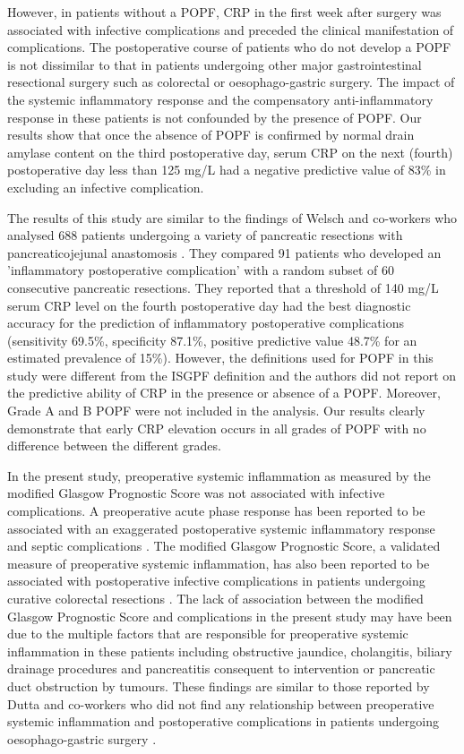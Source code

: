 However, in patients without a POPF, CRP in the first week after surgery was associated with infective complications and preceded the clinical manifestation of complications. 
The postoperative course of patients who do not develop a POPF is not dissimilar to that in patients undergoing other major gastrointestinal resectional surgery such as colorectal or oesophago-gastric surgery. 
The impact of the systemic inflammatory response and the compensatory anti-inflammatory response in these patients is not confounded by the presence of POPF. 
Our results show that once the absence of POPF is confirmed by normal drain amylase content on the third postoperative day, serum CRP on the next (fourth) postoperative day less than 125 mg/L had a negative predictive value of 83\% in excluding an infective complication. 

The results of this study are similar to the findings of Welsch and co-workers who analysed 688 patients undergoing a variety of pancreatic resections with pancreaticojejunal anastomosis \parencite{welsch_persisting_2008}. 
They compared 91 patients who developed an 'inflammatory postoperative complication' with a random subset of 60 consecutive pancreatic resections. 
They reported that a threshold of 140 mg/L serum CRP level on the fourth postoperative day had the best diagnostic accuracy for the prediction of inflammatory postoperative complications (sensitivity 69.5\%, specificity 87.1\%, positive predictive value 48.7\% for an estimated prevalence of 15\%). 
However, the definitions used for POPF in this study were different from the ISGPF definition and the authors did not report on the predictive ability of CRP in the presence or absence of a POPF. 
Moreover, Grade A and B POPF were not included in the analysis. 
Our results clearly demonstrate that early CRP elevation occurs in all grades of POPF with no difference between the different grades.

In the present study, preoperative systemic inflammation as measured by the modified Glasgow Prognostic Score was not associated with infective complications. 
A preoperative acute phase response has been reported to be associated with an exaggerated postoperative systemic inflammatory response and septic complications \parencite{haupt_association_1997}. 
The modified Glasgow Prognostic Score, a validated measure of preoperative systemic inflammation, has also been reported to be associated with postoperative infective complications in patients undergoing curative colorectal resections \parencite{moyes_preoperative_2009}. 
The lack of association between the modified Glasgow Prognostic Score and complications in the present study may have been due to the multiple factors that are responsible for preoperative systemic inflammation in these patients including obstructive jaundice, cholangitis, biliary drainage procedures and pancreatitis consequent to intervention or pancreatic duct obstruction by tumours. 
These findings are similar to those reported by Dutta and co-workers who did not find any relationship between preoperative systemic inflammation and postoperative complications in patients undergoing oesophago-gastric surgery \parencite{dutta_persistent_2011}.

